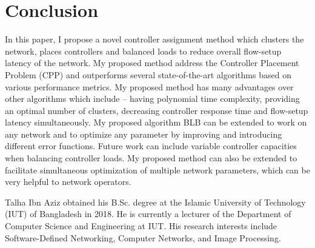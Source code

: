 \documentclass[journal]{IEEEtran}
\begin{document}
\section{Conclusion} \label{conclusion}
In this paper, I propose a novel controller assignment method which clusters the network, places controllers and balanced loads to reduce overall flow-setup latency of the network. My proposed method address the Controller Placement Problem (CPP) and outperforms several state-of-the-art algorithms based on various performance metrics. My proposed method has many advantages over other algorithms which include -- having polynomial time complexity, providing an optimal number of clusters, decreasing controller response time and flow-setup latency simultaneously. My proposed algorithm BLB can be extended to work on any network and to optimize any parameter by improving and introducing different error functions. Future work can include variable controller capacities when balancing controller loads. My proposed method can also be extended to facilitate simultaneous optimization of multiple network parameters, which can be very helpful to network operators.

\ifCLASSOPTIONcaptionsoff
  \newpage
\fi




\begin{IEEEbiography}{Talha Ibn Aziz}
obtained his B.Sc. degree at the Islamic University of Technology (IUT) of Bangladesh in 2018. He is currently a lecturer of the Department of Computer Science and Engineering at IUT. His research interests include Software-Defined Networking, Computer Networks, and Image Processing.
\end{IEEEbiography}
\end{document}
